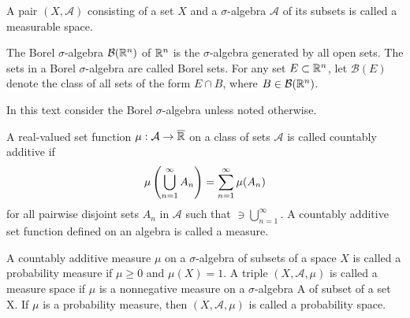 \begin{definition} 
	A pair $(X, \mathcal A)$ consisting of a set $X$ and a $\sigma$-algebra $\mathcal A$ of its subsets is called a measurable space.
\end{definition}

\begin{definition}
	The Borel $\sigma$-algebra $\mathcal{B}(\mathbb{R}^n)$ of $\mathbb{R}^n$ is the $\sigma$-algebra generated by all open sets. The sets in a Borel $\sigma$-algebra are called Borel sets. For any set $E\subset \mathbb{R}^n$, let $\mathcal B(E)$ denote the class of all sets of the form $E\cap B$, where $B\in\mathcal B(\mathbb{R}^n)$.
\end{definition}

In this text consider the Borel $\sigma$-algebra unless noted otherwise. 

\begin{definition}[Measure]
	A real-valued set function $\mu:\mathcal{A}\rightarrow \overline{\mathbb{R}}$ on a class of sets $\mathcal A$ is called countably additive if 
	\begin{equation*}
		\mu\left( \bigcup_{n=1}^{\infty} A_n \right)=\sum_{n=1}^{\infty}\mu(A_n)
	\end{equation*}
	for all pairwise disjoint sets $A_n$ in $\mathcal A$ such that $\mathcal \ni \bigcup_{n=1}^{\infty}$. A countably additive set function defined on an algebra is called a measure.
\end{definition}

\begin{definition}
	A countably additive measure $\mu$ on a $\sigma$-algebra of subsets of a space $X$ is called a probability measure if $\mu\geq 0$ and $\mu(X)=1$.
	A triple $(X, \mathcal A, \mu)$ is called a measure space if $\mu$ is a
	nonnegative measure on a $\sigma$-algebra A of subset of a set X. If $\mu$ is a probability measure, then $(X, \mathcal A, \mu)$ is called a probability space. 
\end{definition}


\begin{definition}[]
\end{definition}

\begin{definition}
\end{definition}

\begin{definition}
\end{definition}

